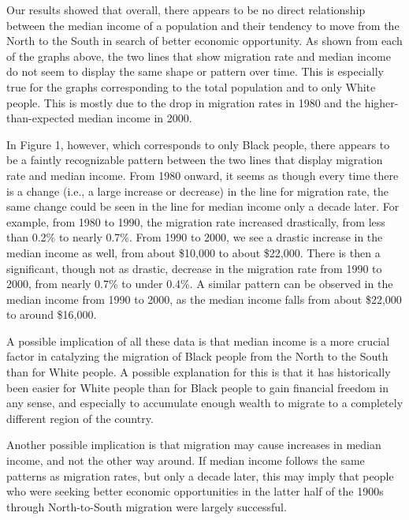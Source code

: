 \documentclass[12pt]{article}
\begin{document}
Our results showed that overall, there appears to be no direct relationship between the median income of a population and their tendency to move from the North to the South in search of better economic opportunity. As shown from each of the graphs above, the two lines that show migration rate and median income do not seem to display the same shape or pattern over time. This is especially true for the graphs corresponding to the total population and to only White people. This is mostly due to the drop in migration rates in 1980 and the higher-than-expected median income in 2000. 

In Figure 1, however, which corresponds to only Black people, there appears to be a faintly recognizable pattern between the two lines that display migration rate and median income. From 1980 onward, it seems as though every time there is a change (i.e., a large increase or decrease) in the line for migration rate, the same change could be seen in the line for median income only a decade later. For example, from 1980 to 1990, the migration rate increased drastically, from less than 0.2\% to nearly 0.7\%. From 1990 to 2000, we see a drastic increase in the median income as well, from about \$10,000 to about \$22,000. There is then a significant, though not as drastic, decrease in the migration rate from 1990 to 2000, from nearly 0.7\% to under 0.4\%. A similar pattern can be observed in the median income from 1990 to 2000, as the median income falls from about \$22,000 to around \$16,000. 

A possible implication of all these data is that median income is a more crucial factor in catalyzing the migration of Black people from the North to the South than for White people. A possible explanation for this is that it has historically been easier for White people than for Black people to gain financial freedom in any sense, and especially to accumulate enough wealth to migrate to a completely different region of the country. 

Another possible implication is that migration may cause increases in median income, and not the other way around. If median income follows the same patterns as migration rates, but only a decade later, this may imply that people who were seeking better economic opportunities in the latter half of the 1900s through North-to-South migration were largely successful. 
\end{document}
